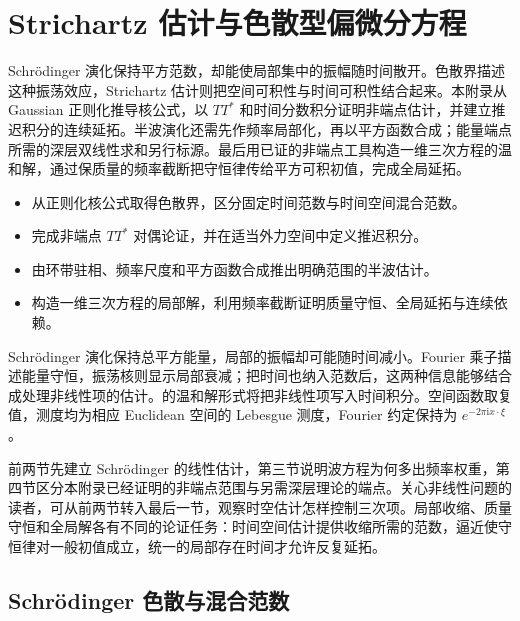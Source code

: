 \chapter{Strichartz 估计与色散型偏微分方程}
\label{b2:app:E}

\begin{chapterabstract}
Schrödinger 演化保持平方范数，却能使局部集中的振幅随时间散开。色散界描述这种振荡效应，Strichartz 估计则把空间可积性与时间可积性结合起来。本附录从 Gaussian 正则化推导核公式，以 \(TT^*\) 和时间分数积分证明非端点估计，并建立推迟积分的连续延拓。半波演化还需先作频率局部化，再以平方函数合成；能量端点所需的深层双线性求和另行标源。最后用已证的非端点工具构造一维三次方程的温和解，通过保质量的频率截断把守恒律传给平方可积初值，完成全局延拓。
\end{chapterabstract}

\begin{learninggoals}\begin{itemize}
\item\label{b2:item:app-E-goal-1}从正则化核公式取得色散界，区分固定时间范数与时间空间混合范数。
\item\label{b2:item:app-E-goal-2}完成非端点 \(TT^*\) 对偶论证，并在适当外力空间中定义推迟积分。
\item\label{b2:item:app-E-goal-3}由环带驻相、频率尺度和平方函数合成推出明确范围的半波估计。
\item\label{b2:item:app-E-goal-4}构造一维三次方程的局部解，利用频率截断证明质量守恒、全局延拓与连续依赖。
\end{itemize}\end{learninggoals}

Schrödinger 演化保持总平方能量，局部的振幅却可能随时间减小。Fourier 乘子描述能量守恒，振荡核则显示局部衰减；把时间也纳入范数后，这两种信息能够结合成处理非线性项的估计。的温和解形式将把非线性项写入时间积分。空间函数取复值，测度均为相应 Euclidean 空间的 Lebesgue 测度，Fourier 约定保持为 \(e^{-2\pi\mathrm i x\cdot\xi}\)。

\ProseParagraphBreak

前两节先建立 Schrödinger 的线性估计，第三节说明波方程为何多出频率权重，第四节区分本附录已经证明的非端点范围与另需深层理论的端点。关心非线性问题的读者，可从前两节转入最后一节，观察时空估计怎样控制三次项。局部收缩、质量守恒和全局解各有不同的论证任务：时间空间估计提供收缩所需的范数，逼近使守恒律对一般初值成立，统一的局部存在时间才允许反复延拓。

\section{Schrödinger 色散与混合范数}
\label{b2:sec:app-E-1}

